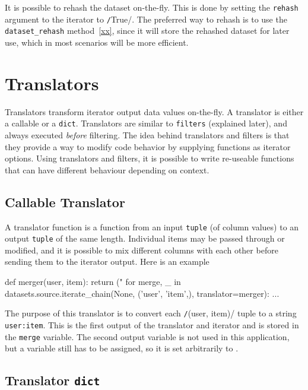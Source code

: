 It is possible to rehash the dataset on-the-fly.  This is done by
setting the \texttt{rehash} argument to the iterator to
\texttt/True/.  The preferred way to rehash is to use the
\texttt{dataset\_rehash} method~\ref{xx}, since it will store the
rehashed dataset for later use, which in most scenarios will be more
efficient.


\section{Translators}

Translators transform iterator output data values on-the-fly.  A
translator is either a callable or a \texttt{dict}.  Translators are
similar to \texttt{filters} (explained later), and always
executed \emph{before} filtering.  The idea behind translators and
filters is that they provide a way to modify code behavior by
supplying functions as iterator options.  Using translators and
filters, it is possible to write re-useable functions that can have
different behaviour depending on context.


\subsection*{Callable Translator}

A translator function is a function from an input \texttt{tuple} (of
column values) to an output \texttt{tuple} of the same length.
Individual items may be passed through or modified, and it is possible
to mix different columns with each other before sending them to the
iterator output.  Here is an example
\begin{python}
def merger(user, item):
    return ("%
for merge, _ in datasets.source.iterate_chain(None, ('user', 'item',),
                                     translator=merger):
    ...
\end{python}
The purpose of this translator is to convert each
\texttt/(user, item)/ tuple to a string \texttt{user:item}.  This is
the first output of the translator and iterator and is stored in the
\texttt{merge} variable.  The second output variable is not used in
this application, but a variable still has to be assigned, so it is
set arbitrarily to \pyNone.



\subsection*{Translator \texttt{dict}}

